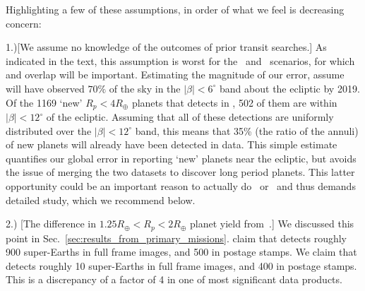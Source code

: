 Highlighting a few of these assumptions, in order of what we feel is decreasing
concern:
\begin{description}
\item 1.)[We assume no knowledge of the outcomes of prior transit searches.]
  	As indicated in the text, this assumption is worst for the
        \elong\ and \eshort\ scenarios, for which \ktwo and \tesss
        overlap will be important.  Estimating the magnitude of our
        error, assume \ktwo will have observed $70\%$ of the sky in
        the $|\beta|<6^\circ$ band about the ecliptic by 2019.  Of the
        1169 `new' $R_p<4R_\oplus$ planets that \tess detects in
        \elong, 502 of them are within $|\beta|<12^\circ$ of the
        ecliptic.  Assuming that all of these detections are uniformly
        distributed over the $|\beta|<12^\circ$ band, this means that
        35\% (the ratio of the annuli) of \tesss new planets will
        already have been detected in \ktwo data.  This simple
        estimate quantifies our global error in reporting `new'
        planets near the ecliptic, but avoids the issue of merging the
        two datasets to discover long period planets.  This latter
        opportunity could be an important reason to actually do
        \elong\ or \eshort\ and thus demands detailed study, which we
        recommend below.
	
	\item 2.) [The difference in $1.25R_\oplus<R_p<2R_\oplus$
          planet yield from~\protect{}.]  We
          discussed this point in
          Sec.~\ref{sec:results_from_primary_missions}.
           claim that \tess detects roughly
          900 super-Earths in full frame images, and 500 in postage
          stamps.  We claim that \tess detects roughly 10 super-Earths
          in full frame images, and 400 in postage stamps.  This is a
          discrepancy of a factor of 4 in one of \tesss most
          significant data products.
        

\end{description}
